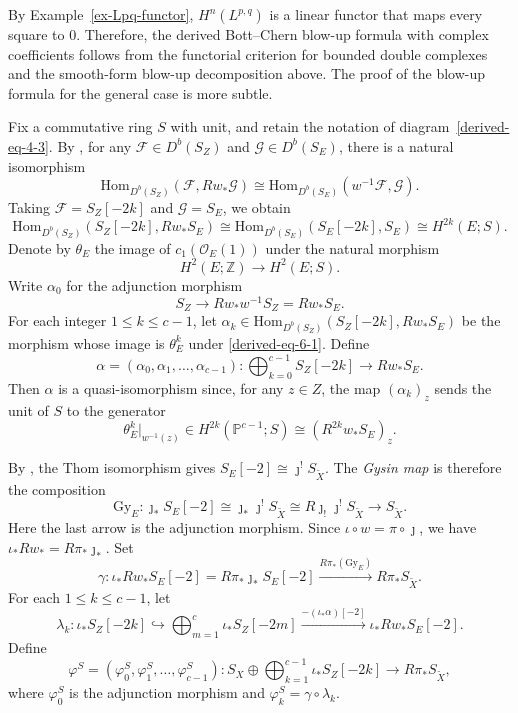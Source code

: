 \documentclass[11pt]{amsart}
\numberwithin{equation}{section}
\theoremstyle{plain}
\theoremstyle{definition}
\begin{document}
By Example~\ref{ex-Lpq-functor}, $H^n(L^{p,q})$ is a linear functor that
maps every square to $0$.  Therefore, the derived Bott--Chern blow-up
formula with complex coefficients follows from the functorial criterion
for bounded double complexes and the smooth-form blow-up decomposition above.
The proof of the blow-up formula for the general case is more subtle.


Fix a commutative ring $S$ with unit, and retain the notation of
diagram~\eqref{derived-eq-4-3}.
By \cite[\S~2.6]{KS}, for any $\mathcal{F}\in D^b(S_Z)$ and
$\mathcal{G}\in D^b(S_E)$, there is a natural isomorphism
\[
\mathrm{Hom}_{D^b(S_Z)}(\mathcal F,Rw_*\mathcal G)
\cong
\mathrm{Hom}_{D^b(S_E)}(w^{-1}\mathcal F,\mathcal G).
\]
Taking $\mathcal F=S_Z[-2k]$ and $\mathcal G=S_{E}$, we obtain
   \begin{equation}\label{derived-eq-6-1}\mathrm{Hom}_{D^b(S_Z)}(S_Z[-2k], Rw_*S_{E})\cong \mathrm{Hom}_{D^b(S_E)}(S_{E}[-2k], S_{E})\cong H^{2k}(E;S).\end{equation}
Denote by $\theta_E$ the image of $c_1(\mathcal O_{E}(1))$ under the natural
morphism
\[
H^2(E;\mathbb Z)\longrightarrow H^2(E;S).
\]
Write $\alpha_0$ for the adjunction morphism
\[
S_Z\longrightarrow Rw_*w^{-1}S_Z=Rw_*S_{E}.
\]
For each integer $1\le k\le c-1$, let
$\alpha_k\in\mathrm{Hom}_{D^b(S_Z)}(S_Z[-2k],Rw_*S_{E})$ be the morphism
whose image is $\theta_E^k$ under \eqref{derived-eq-6-1}.  Define
\[\alpha=(\alpha_0,\alpha_1,\ldots,\alpha_{c-1}):
\bigoplus_{k=0}^{c-1}S_Z[-2k]\longrightarrow Rw_*S_{E}.\]
Then $\alpha$ is a quasi-isomorphism since, for any $z\in Z$, the map
$(\alpha_k)_z$ sends the unit of $S$ to the generator
\[
\theta_E^k\vert_{w^{-1}(z)}\in H^{2k}(\mathbb P^{c-1};S)
\cong (R^{2k}w_*S_{E})_z.
\]

By \cite[\S~3.3]{KS}, the Thom isomorphism gives
$S_{E}[-2]\cong \jmath^!S_{\tilde{X}}$.  The
\emph{Gysin map} is therefore the composition
  \[\mathrm{Gy}_{E}: \jmath_*S_{E}[-2] \cong \jmath_*\jmath^!S_{\tilde{X}}\cong R\jmath_!\jmath^!S_{\tilde{X}}\longrightarrow  S_{\tilde{X}}.\]
Here the last arrow is the adjunction morphism.
Since $\iota\circ w=\pi\circ \jmath$, we have
$\iota_*Rw_*=R\pi_*\jmath_*$.  Set
\[\gamma:\iota_*Rw_*S_{E}[-2]=R\pi_*\jmath_*S_{E}[-2]
\xrightarrow{R\pi_*(\mathrm{Gy}_{E})}R\pi_*S_{\tilde{X}}.\]
For each $1\le k\le c-1$, let
\[
\lambda_k:\iota_*S_Z[-2k]\hookrightarrow
\bigoplus_{m=1}^{c}\iota_*S_Z[-2m]
\xrightarrow{-(\iota_*\alpha)[-2]}\iota_*Rw_*S_{E}[-2].
\]
Define
\begin{equation}\label{derived-eq-6-2}
\varphi^S=(\varphi_0^S,\varphi_1^S,\ldots,\varphi_{c-1}^S):
S_X\oplus\bigoplus_{k=1}^{c-1}\iota_*S_Z[-2k]
\longrightarrow R\pi_*S_{\tilde{X}},
\end{equation}
where $\varphi_0^S$ is the adjunction morphism and
$\varphi_k^S=\gamma\circ\lambda_k$.
\end{document}
